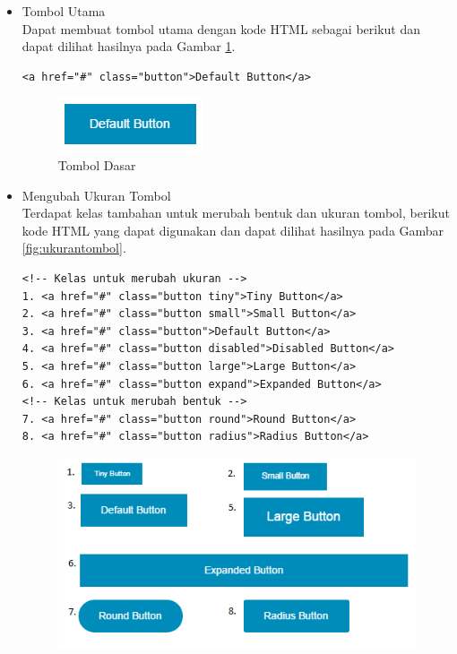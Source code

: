 \begin{enumerate}[(1)]
\begin{itemize}
\item Tombol Utama\\
Dapat membuat tombol utama dengan kode HTML sebagai berikut dan dapat
dilihat hasilnya pada Gambar \ref{fig:tomboldasar}.
\begin{lstlisting}[basicstyle=\footnotesize]
<a href="#" class="button">Default Button</a>
\end{lstlisting}
\begin{figure}[H]
\centering
\includegraphics[scale=1]{Gambar/tomboldasar.png}
\caption[Tombol Dasar]{Tombol Dasar}
\label{fig:tomboldasar}
\end{figure}
\item Mengubah Ukuran Tombol\\
Terdapat kelas tambahan untuk merubah bentuk dan ukuran tombol, berikut kode HTML yang dapat digunakan dan dapat dilihat hasilnya pada Gambar \ref{fig:ukurantombol}.
\begin{lstlisting}[basicstyle=\footnotesize]
<!-- Kelas untuk merubah ukuran -->
1. <a href="#" class="button tiny">Tiny Button</a>
2. <a href="#" class="button small">Small Button</a>
3. <a href="#" class="button">Default Button</a>
4. <a href="#" class="button disabled">Disabled Button</a>
5. <a href="#" class="button large">Large Button</a>
6. <a href="#" class="button expand">Expanded Button</a>
<!-- Kelas untuk merubah bentuk -->
7. <a href="#" class="button round">Round Button</a>
8. <a href="#" class="button radius">Radius Button</a>
\end{lstlisting}
\begin{figure}[H]
\centering
\includegraphics[scale=1]{Gambar/ukurantombol.png}

\end{figure}
\end{itemize}
\end{enumerate}

